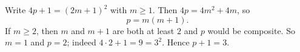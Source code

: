 Write $4p+1=(2m+1)^2$ with $m\ge1$. Then $4p=4m^2+4m$, so
\[p=m(m+1).\]
If $m\ge2$, then $m$ and $m+1$ are both at least $2$ and $p$ would be composite. So $m=1$ and $p=2$; indeed $4\cdot2+1=9=3^2$. Hence $p+1=\boxed{3}$.
